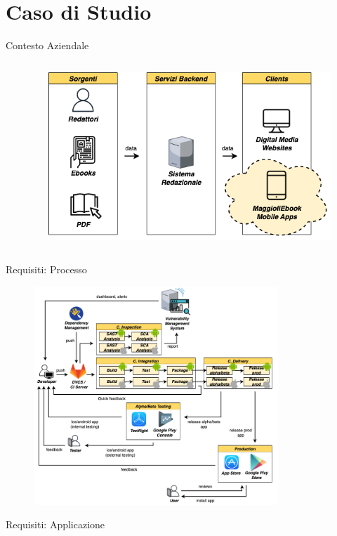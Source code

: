 
\section{Caso di Studio}

\begin{frame}{Contesto Aziendale}
    \begin{columns}[onlytextwidth]
        \begin{column}{0.5\textwidth}

        \end{column}
        \begin{column}{0.5\textwidth}
             \begin{figure}[H]
                \includegraphics[width=1\textwidth]{img/contesto-aziendale.png}
            \end{figure}
        \end{column}
    \end{columns}
\end{frame}

\begin{frame}{Requisiti: Processo}
    
\end{frame}

\begin{frame}
    \begin{figure}[H]
        \includegraphics[width=0.82\textwidth]{img/full-cicd.png}
    \end{figure}
\end{frame}

\begin{frame}{Requisiti: Applicazione}

\end{frame}